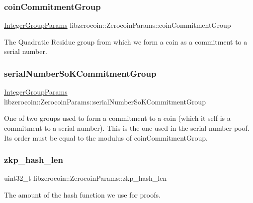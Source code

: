 \subsubsection{\texorpdfstring{coinCommitmentGroup}{coinCommitmentGroup}}
{\footnotesize\ttfamily \mbox{\hyperlink{classlibzerocoin_1_1_integer_group_params}{Integer\+Group\+Params}} libzerocoin\+::\+Zerocoin\+Params\+::coin\+Commitment\+Group}

The Quadratic Residue group from which we form a coin as a commitment to a serial number. \mbox{\label{classlibzerocoin_1_1_zerocoin_params_a6360b02f49690260136fe79d85914dcc}} 
\subsubsection{\texorpdfstring{serialNumberSoKCommitmentGroup}{serialNumberSoKCommitmentGroup}}
{\footnotesize\ttfamily \mbox{\hyperlink{classlibzerocoin_1_1_integer_group_params}{Integer\+Group\+Params}} libzerocoin\+::\+Zerocoin\+Params\+::serial\+Number\+So\+K\+Commitment\+Group}

One of two groups used to form a commitment to a coin (which it self is a commitment to a serial number). This is the one used in the serial number poof. It\textquotesingle{}s order must be equal to the modulus of coin\+Commitment\+Group. \mbox{\label{classlibzerocoin_1_1_zerocoin_params_a76d6a2e590469d3e07200aa0f4b5ddef}} 
\subsubsection{\texorpdfstring{zkp\_hash\_len}{zkp\_hash\_len}}
{\footnotesize\ttfamily uint32\+\_\+t libzerocoin\+::\+Zerocoin\+Params\+::zkp\+\_\+hash\+\_\+len}

The amount of the hash function we use for proofs. \mbox{\label{classlibzerocoin_1_1_zerocoin_params_a9bdd86029187d93275c5362ff858b81c}} 
